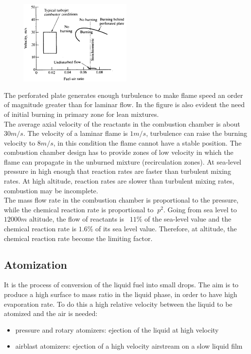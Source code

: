 \documentclass[12pt]{article}
\begin{document}
\begin{figure}[h!]
\centering
\includegraphics[width=0.5\textwidth]{figures/flame1.png}
\end{figure}

The perforated plate generates enough turbulence to make flame speed an order of magnitude greater than for laminar flow. In the figure is also evident the need of initial burning in primary zone for lean mixtures.\\
The average axial velocity of the reactants in the combustion chamber is about $30 m/s$. The velocity of a laminar flame is $1 m/s$, turbulence can raise the burning velocity to $8 m/s$, in this condition the flame cannot have a stable position. The combustion chamber design has to provide zones of low velocity in which the flame can propagate in the unburned mixture (recirculation zones). At sea-level pressure in high enough that reaction rates are faster than turbulent mixing rates. At high altitude, reaction rates are slower than turbulent mixing rates, combustion may be incomplete.\\
The mass flow rate in the combustion chamber is proportional to the pressure, while the chemical reaction rate is proportional to $~p^{2}$. Going from sea level to $12000 m$ altitude, the flow of reactants is ~$11\%$ of the sea-level value and the chemical reaction rate is $1.6\%$ of its sea level value. Therefore, at altitude, the chemical reaction rate become the limiting factor.

\subsection{Atomization}

It is the process of conversion of the liquid fuel into small drops. The aim is to produce a high surface to mass ratio in the liquid phase, in order to have high evaporation rate. To do this a high relative velocity between the liquid to be atomized and the air is needed:
\begin{itemize}
    \item pressure and rotary atomizers: ejection of the liquid at high velocity
    \item airblast atomizers: ejection of a high velocity airstream on a slow liquid film
\end{itemize}
\end{document}
